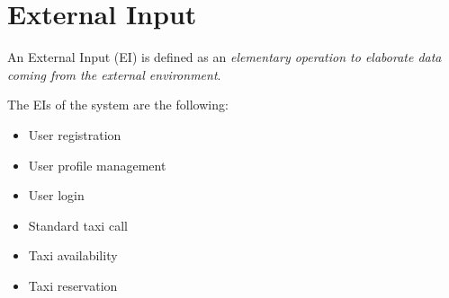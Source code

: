 \section{External Input}
An External Input (EI) is defined as an \emph{elementary operation to elaborate data coming from the external environment}.

The EIs of the system are the following:
\begin{itemize}
	\item User registration
	\item User profile management
	\item User login
	\item Standard taxi call
	\item Taxi availability
	\item Taxi reservation
\end{itemize}

